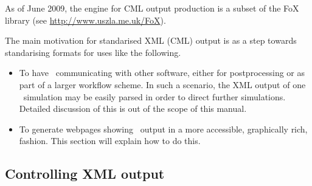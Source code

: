 As of June 2009, the engine for CML output production is a subset of
the FoX library (see \url{http://www.uszla.me.uk/FoX}).

The main motivation for standarised XML (CML) output is as a step
towards standarising formats for uses like the following.

\begin{itemize}

\item To have \siesta\ communicating with other software, either
for postprocessing or as part of a larger workflow scheme. In such a
scenario, the XML output of one \siesta\ simulation may be easily parsed
in order to direct further simulations. Detailed discussion of this is
out of the scope of this manual.

\item To generate webpages showing \siesta\ output in a more accessible,
graphically rich, fashion. This section will explain how to do this.

\end{itemize}

\subsection{Controlling XML output}

